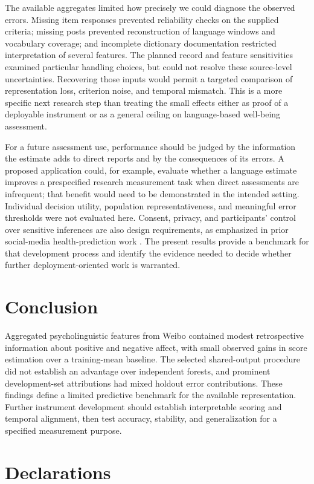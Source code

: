 The available aggregates limited how precisely we could diagnose the observed errors. Missing item responses prevented reliability checks on the supplied criteria; missing posts prevented reconstruction of language windows and vocabulary coverage; and incomplete dictionary documentation restricted interpretation of several features. The planned record and feature sensitivities examined particular handling choices, but could not resolve these source-level uncertainties. Recovering those inputs would permit a targeted comparison of representation loss, criterion noise, and temporal mismatch. This is a more specific next research step than treating the small effects either as proof of a deployable instrument or as a general ceiling on language-based well-being assessment.

For a future assessment use, performance should be judged by the information the estimate adds to direct reports and by the consequences of its errors. A proposed application could, for example, evaluate whether a language estimate improves a prespecified research measurement task when direct assessments are infrequent; that benefit would need to be demonstrated in the intended setting. Individual decision utility, population representativeness, and meaningful error thresholds were not evaluated here. Consent, privacy, and participants' control over sensitive inferences are also design requirements, as emphasized in prior social-media health-prediction work \citep{eichstaedt2018}. The present results provide a benchmark for that development process and identify the evidence needed to decide whether further deployment-oriented work is warranted.

\section{Conclusion}
Aggregated psycholinguistic features from Weibo contained modest retrospective information about positive and negative affect, with small observed gains in score estimation over a training-mean baseline. The selected shared-output procedure did not establish an advantage over independent forests, and prominent development-set attributions had mixed holdout error contributions. These findings define a limited predictive benchmark for the available representation. Further instrument development should establish interpretable scoring and temporal alignment, then test accuracy, stability, and generalization for a specified measurement purpose.

\section{Declarations}
